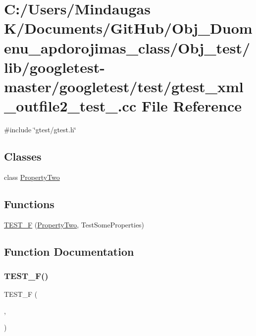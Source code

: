 \hypertarget{_obj__test_2lib_2googletest-master_2googletest_2test_2gtest__xml__outfile2__test___8cc}{}\section{C\+:/\+Users/\+Mindaugas K/\+Documents/\+Git\+Hub/\+Obj\+\_\+\+Duomenu\+\_\+apdorojimas\+\_\+class/\+Obj\+\_\+test/lib/googletest-\/master/googletest/test/gtest\+\_\+xml\+\_\+outfile2\+\_\+test\+\_\+.cc File Reference}
\label{_obj__test_2lib_2googletest-master_2googletest_2test_2gtest__xml__outfile2__test___8cc}
{\ttfamily \#include \char`\"{}gtest/gtest.\+h\char`\"{}}\newline
\subsection*{Classes}
\begin{DoxyCompactItemize}
\item 
class \mbox{\hyperlink{class_property_two}{Property\+Two}}
\end{DoxyCompactItemize}
\subsection*{Functions}
\begin{DoxyCompactItemize}
\item 
\mbox{\hyperlink{_obj__test_2lib_2googletest-master_2googletest_2test_2gtest__xml__outfile2__test___8cc_a40b5d77ad85226c30fc3aa4f1e4f7bb5}{T\+E\+S\+T\+\_\+F}} (\mbox{\hyperlink{class_property_two}{Property\+Two}}, Test\+Some\+Properties)
\end{DoxyCompactItemize}


\subsection{Function Documentation}
\mbox{\label{_obj__test_2lib_2googletest-master_2googletest_2test_2gtest__xml__outfile2__test___8cc_a40b5d77ad85226c30fc3aa4f1e4f7bb5}} 
\subsubsection{\texorpdfstring{TEST\_F()}{TEST\_F()}}
{\footnotesize\ttfamily T\+E\+S\+T\+\_\+F (\begin{DoxyParamCaption}\item[{\mbox{\hyperlink{class_property_two}{Property\+Two}}}]{,  }\item[{Test\+Some\+Properties}]{ }\end{DoxyParamCaption})}


